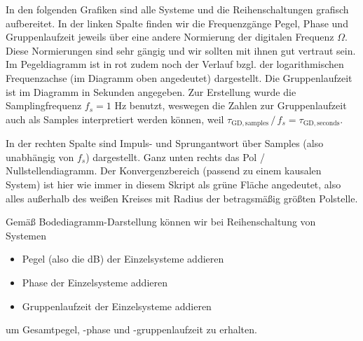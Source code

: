 \begin{Loesung}
\begin{center}
\end{center}

In den folgenden Grafiken sind alle Systeme und die Reihenschaltungen
grafisch aufbereitet.
In der linken Spalte finden wir die Frequenzgänge Pegel, Phase und Gruppenlaufzeit
jeweils über eine andere Normierung der digitalen Frequenz $\Omega$.
Diese Normierungen sind sehr gängig und wir sollten mit ihnen gut vertraut sein.
Im Pegeldiagramm ist in rot zudem noch der Verlauf bzgl. der logarithmischen
Frequenzachse (im Diagramm oben angedeutet) dargestellt.
Die Gruppenlaufzeit ist im Diagramm in Sekunden angegeben. Zur Erstellung
wurde die Samplingfrequenz $f_s=1$ Hz benutzt, weswegen
die Zahlen zur Gruppenlaufzeit auch als Samples interpretiert werden können, weil
$\tau_\mathrm{GD,samples} \,/\, f_s = \tau_\mathrm{GD,seconds}$.

In der rechten Spalte sind Impuls- und Sprungantwort über Samples (also unabhängig
von $f_s$) dargestellt. Ganz unten rechts das Pol / Nullstellendiagramm.
Der Konvergenzbereich (passend zu einem kausalen System)
ist hier wie immer in diesem Skript als grüne Fläche angedeutet, also alles außerhalb
des weißen Kreises mit Radius der betragsmäßig größten Polstelle.

Gemäß Bodediagramm-Darstellung können wir bei Reihenschaltung von Systemen
\begin{itemize}
  \item Pegel (also die dB) der Einzelsysteme addieren
  \item Phase der Einzelsysteme addieren
  \item Gruppenlaufzeit der Einzelsysteme addieren
\end{itemize}
um Gesamtpegel, -phase und -gruppenlaufzeit zu erhalten.


\end{Loesung}

